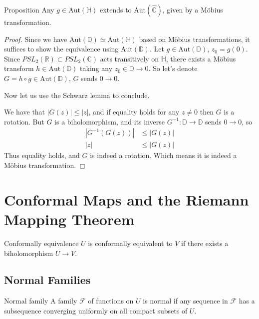 \documentclass{article}
\begin{document}
\begin{misc}{Proposition}{}
Any \( g \in \mathrm{Aut} (\mathbb{H} ) \) extends to \( \mathrm{Aut}(\hat{\mathbb{C}} )  \), given by a Möbius transformation.
\tcbline
\begin{proof}
Since we have  \( \mathrm{Aut}(\mathbb{D} ) \simeq \mathrm{Aut} (\mathbb{H} )   \) based on Möbius transformations, it suffices to show the equivalence using \( \mathrm{Aut}(\mathbb{D} ) \). Let \( g \in \mathrm{Aut} (\mathbb{D} ) \), \( z_0 = g(0) \). Since \( PSL_2 (\mathbb{R} ) \subset PSL_2(\mathbb{C} )\) acts transitively on \( \mathbb{H}  \), there exists a Möbius transform \( h \in \mathrm{Aut} (\mathbb{D} ) \) taking any \( z_0 \in \mathbb{D} \to 0 \).
So let's denote \( G = h \circ g \in \mathrm{Aut} (\mathbb{D} ) \), \( G \) sends \( 0 \to  0\). 

Now let us use the Schwarz lemma to conclude. 

We have that \( |G(z)| \leq |z| \), and if equality holds for any \( z\neq 0 \) then \( G \) is a rotation. But \( G \) is a biholomorphism, and its inverse \( G ^{-1} : \mathbb{D} \to \mathbb{D}  \)  sends \( 0 \to  0 \), so 
\begin{align*}
    |G^{-1} (G(z))| &\leq |G(z)|\\
    |z| &\leq |G(z)|
\end{align*}
Thus equality holds, and \( G \) is indeed a rotation. Which means it is indeed a Möbius transformation.
\end{proof}

\end{misc}

\section{Conformal Maps and the Riemann Mapping Theorem}

\begin{defn}{Conformally equivalence}{}
\( U \) is conformally equivalent to \( V \) if there exists a biholomorphism \( U \to V \). 
\end{defn}

\subsection{Normal Families}

\begin{defn}{Normal family}{}
A family \(  \mathcal{F}  \) of functions on \( U \) is normal if any sequence in \( \mathcal{F}   \) has a subsequence converging uniformly on all compact subsets of \( U \).
\end{defn}
\end{document}
